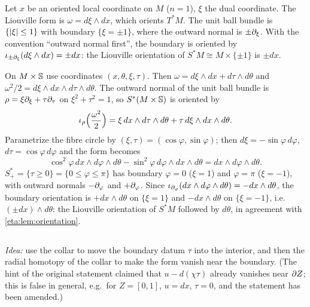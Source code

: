 Let $x$ be an oriented local coordinate on $M$ ($n=1$), $\xi$ the dual coordinate.
The Liouville form is $\omega=d\xi\wedge dx$, which orients $T^*M$. The unit ball
bundle is $\{\lvert \xi\rvert\le1\}$ with boundary $\{\xi=\pm1\}$, where the outward normal
is $\pm\partial_\xi$. With the convention ``outward normal first'', the boundary is
oriented by $\iota_{\pm\partial_\xi}(d\xi\wedge dx)=\pm dx$: the Liouville orientation of
$S^*M\cong M\times\{\pm1\}$ is $\pm dx$.

On $M\times\mathbb{S}$ use coordinates $(x,\theta,\xi,\tau)$. Then
$\omega=d\xi\wedge dx+d\tau\wedge d\theta$ and $\omega^2/2=d\xi\wedge dx\wedge d\tau\wedge
d\theta$. The outward normal of the unit ball bundle is $\rho=\xi\partial_\xi+\tau\partial_\tau$
on $\xi^2+\tau^2=1$, so $S^*(M\times\mathbb{S})$ is oriented by
\begin{equation*}
  \iota_\rho\Bigl(\frac{\omega^2}2\Bigr)=\xi\,dx\wedge d\tau\wedge d\theta+\tau\,d\xi\wedge
  dx\wedge d\theta .
\end{equation*}
Parametrize the fibre circle by $(\xi,\tau)=(\cos\varphi,\sin\varphi)$; then
$d\xi=-\sin\varphi\,d\varphi$, $d\tau=\cos\varphi\,d\varphi$ and the form becomes
\begin{equation*}
  \cos^2\varphi\,dx\wedge d\varphi\wedge d\theta-\sin^2\varphi\,d\varphi\wedge dx\wedge d\theta
  =dx\wedge d\varphi\wedge d\theta .
\end{equation*}
$S^*_+=\{\tau\ge0\}=\{0\le\varphi\le\pi\}$ has boundary $\varphi=0$ ($\xi=1$) and
$\varphi=\pi$ ($\xi=-1$), with outward normals $-\partial_\varphi$ and $+\partial_\varphi$. Since
$\iota_{\partial_\varphi}(dx\wedge d\varphi\wedge d\theta)=-dx\wedge d\theta$, the boundary
orientation is $+dx\wedge d\theta$ on $\{\xi=1\}$ and $-dx\wedge d\theta$ on
$\{\xi=-1\}$, i.e.\ $(\pm dx)\wedge d\theta$: the Liouville orientation of $S^*M$
followed by $d\theta$, in agreement with \cref{eta:lem:orientation}.

\subsection*{}

\emph{Idea:} use the collar to move the boundary datum $\tau$ into the interior, and
then the radial homotopy of the collar to make the form vanish near the boundary.
(The hint of the original statement claimed that $u-d(\chi\tau)$ already vanishes
near $\partial Z$; this is false in general, e.g.\ for $Z=[0,1]$, $u=dx$, $\tau=0$, and
the statement has been amended.)

